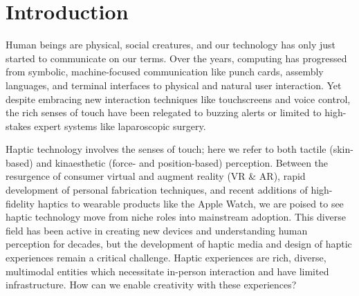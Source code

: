 
\chapter{Introduction}
\label{ch:Introduction}
Human beings are physical, social creatures, and our technology has only just started to communicate on our terms.
Over the years, computing has progressed from symbolic, machine-focused communication like punch cards, assembly languages, and terminal interfaces to physical and natural user interaction.
Yet despite embracing new interaction techniques like touchscreens and voice control, the rich senses of touch have been relegated to buzzing alerts or limited to high-stakes expert systems like laparoscopic surgery.

Haptic technology involves the senses of touch; here we refer to both tactile (skin-based) and kinaesthetic (force- and position-based) perception.
Between the resurgence of consumer virtual and augment reality (VR \& AR), rapid development of personal fabrication techniques, and recent additions of high-fidelity haptics to wearable products like the Apple Watch, we are poised to see haptic technology move from niche roles into mainstream adoption.
This diverse field has been active in creating new devices and understanding human perception for decades, but the development of haptic media and design of haptic experiences remain a critical challenge.
Haptic experiences are rich, diverse, multimodal entities which necessitate in-person interaction and have limited infrastructure.
How can we enable creativity with these experiences?

